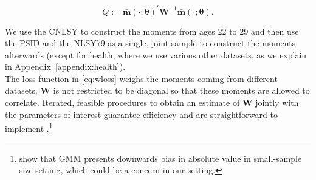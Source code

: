 \begin{equation}
Q :=  {\bm{\bar{m}} \left( \cdot ; \bm{\theta} \right) }^{'} \bm{W} ^{-1} {\bm{\bar{m}} \left( \cdot ; \bm{\theta} \right)}. \label{eq:wloss}
\end{equation}

\noindent We use the CNLSY to construct the moments from ages 22 to 29 and then use the PSID and the NLSY79 as a single, joint sample to construct the moments afterwards (except for health, where we use various other datasets, as we explain in Appendix~\ref{appendix:health}).\\

\noindent The loss function in \eqref{eq:wloss} weighs the moments coming from different datasets. $\bm{W}$ is not restricted to be diagonal so that these moments are allowed to correlate. Iterated, feasible procedures to obtain an estimate of $\bm{W}$ jointly with the parameters of interest guarantee efficiency and are straightforward to implement \citep{Hansen_1982_Econometrica,Amemiya_1985_advanced}.\footnote{\citet{Altonji_Segal_1996_JoBaES} show that GMM presents downwards bias in absolute value in small-sample size setting, which could be a concern in our setting.} 

\singlespace






